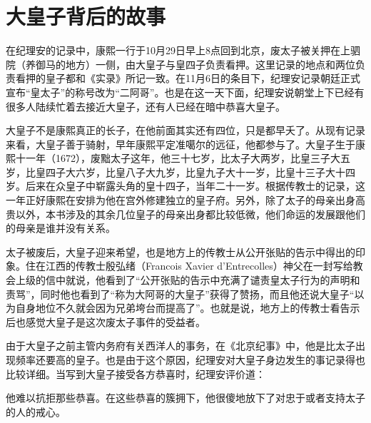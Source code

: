 \section{大皇子背后的故事}


在纪理安的记录中，康熙一行于10月29日早上8点回到北京，废太子被关押在上驷院（养御马的地方）一侧，由大皇子与皇四子负责看押。这里记录的地点和两位负责看押的皇子都和《实录》所记一致。在11月6日的条目下，纪理安记录朝廷正式宣布“皇太子”的称号改为“二阿哥”。也是在这一天下面，纪理安说朝堂上下已经有很多人陆续忙着去接近大皇子，还有人已经在暗中恭喜大皇子。



大皇子不是康熙真正的长子，在他前面其实还有四位，只是都早夭了。从现有记录来看，大皇子善于骑射，早年康熙平定准噶尔的远征，他都参与了。大皇子生于康熙十一年（1672），废黜太子这年，他三十七岁，比太子大两岁，比皇三子大五岁，比皇四子大六岁，比皇八子大九岁，比皇九子大十一岁，比皇十三子大十四岁。后来在众皇子中崭露头角的皇十四子，当年二十一岁。根据传教士的记录，这一年正好康熙在安排为他在宫外修建独立的皇子府。另外，除了太子的母亲出身高贵以外，本书涉及的其余几位皇子的母亲出身都比较低微，他们命运的发展跟他们的母亲是谁并没有关系。

太子被废后，大皇子迎来希望，也是地方上的传教士从公开张贴的告示中得出的印象。住在江西的传教士殷弘绪（Francois Xavier d'Entrecolles）神父在一封写给教会上级的信中就说，他看到了“公开张贴的告示中充满了谴责皇太子行为的声明和责骂”，同时他也看到了“称为大阿哥的大皇子”获得了赞扬，而且他还说大皇子“以为自身地位不久就会因为兄弟垮台而提高了”。也就是说，地方上的传教士看告示后也感觉大皇子是这次废太子事件的受益者。



由于大皇子之前主管内务府有关西洋人的事务，在《北京纪事》中，他是比太子出现频率还要高的皇子。也是由于这个原因，纪理安对大皇子身边发生的事记录得也比较详细。当写到大皇子接受各方恭喜时，纪理安评价道：



\begin{bookquote}他难以抗拒那些恭喜。在这些恭喜的簇拥下，他很傻地放下了对忠于或者支持太子的人的戒心。\end{bookquote}

